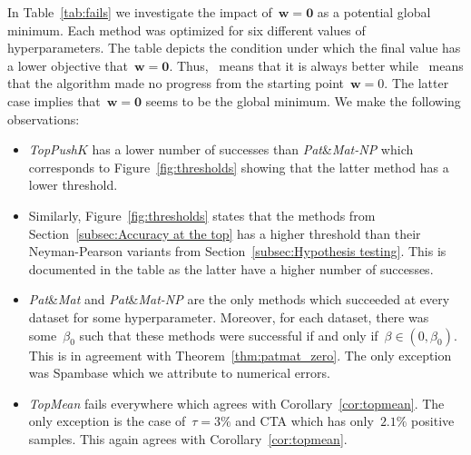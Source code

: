 \documentclass[11pt,a4paper]{article}
\theoremstyle{definition}
\newcommand{\cmark}{\textcolor{mygreen}{\ding{51}}}
\newcommand{\xmark}{\textcolor{myred}{\ding{55}}}
\newcommand{\toppushk}{\textit{TopPush$K$}\xspace}
\newcommand{\patmat}{\textit{Pat}\textup{\&}\textit{Mat}\xspace}
\newcommand{\topmean}{\textit{TopMean}\xspace}
\newcommand{\patmatnp}{\textit{Pat}\textup{\&}\textit{Mat-NP}\xspace}
\begin{document}
\noindent In Table~\ref{tab:fails} we investigate the impact of~$\bm{w}=\bm{0}$ as a potential global minimum. Each method was optimized for six different values of hyperparameters. The table depicts the condition under which the final value has a lower objective that~$\bm{w}=\bm{0}.$ Thus, \cmark\ means that it is always better while \xmark\ means that the algorithm made no progress from the starting point~$\bm{w} =0.$ The latter case implies that~$\bm{w}=\bm{0}$ seems to be the global minimum. We make the following observations:
\begin{itemize}
  \item \toppushk has a lower number of successes than \patmatnp which corresponds to Figure~\ref{fig:thresholds} showing that the latter method has a lower threshold.
  \item Similarly, Figure~\ref{fig:thresholds} states that the methods from Section~\ref{subsec:Accuracy at the top} has a higher threshold than their Neyman-Pearson variants from Section~\ref{subsec:Hypothesis testing}. This is documented in the table as the latter have a higher number of successes.
  \item \patmat and \patmatnp are the only methods which succeeded at every dataset for some hyperparameter. Moreover, for each dataset, there was some~$\beta_0$ such that these methods were successful if and only if~$\beta\in(0,\beta_0).$ This is in agreement with Theorem~\ref{thm:patmat_zero}. The only exception was Spambase which we attribute to numerical errors.
  \item \topmean fails everywhere which agrees with Corollary~\ref{cor:topmean}. The only exception is the case of~$\tau=3\%$ and CTA which has only~$2.1\%$ positive samples. This again agrees with Corollary~\ref{cor:topmean}.
\end{itemize}
\end{document}
